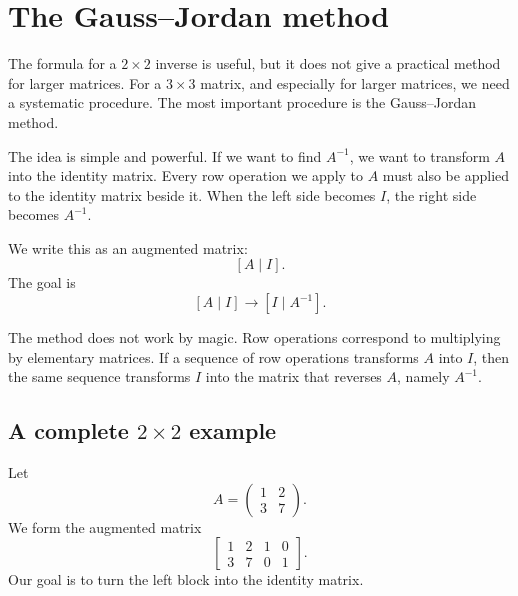 \section{The Gauss--Jordan method}

The formula for a \(2\times2\) inverse is useful, but it does not give a practical method for larger matrices. For a \(3\times3\) matrix, and especially for larger matrices, we need a systematic procedure. The most important procedure is the Gauss--Jordan method.

The idea is simple and powerful. If we want to find \(A^{-1}\), we want to transform \(A\) into the identity matrix. Every row operation we apply to \(A\) must also be applied to the identity matrix beside it. When the left side becomes \(I\), the right side becomes \(A^{-1}\).

We write this as an augmented matrix:
\[
[A\mid I].
\]
The goal is
\[
[A\mid I] \longrightarrow [I\mid A^{-1}].
\]

\begin{remarkbox}
The method does not work by magic. Row operations correspond to multiplying by elementary matrices. If a sequence of row operations transforms \(A\) into \(I\), then the same sequence transforms \(I\) into the matrix that reverses \(A\), namely \(A^{-1}\).
\end{remarkbox}

\subsection{A complete \(2\times2\) example}

Let
\[
A=\begin{pmatrix}1&2\\3&7\end{pmatrix}.
\]
We form the augmented matrix
\[
\left[\begin{array}{cc|cc}
1&2&1&0\\
3&7&0&1
\end{array}\right].
\]
Our goal is to turn the left block into the identity matrix.

